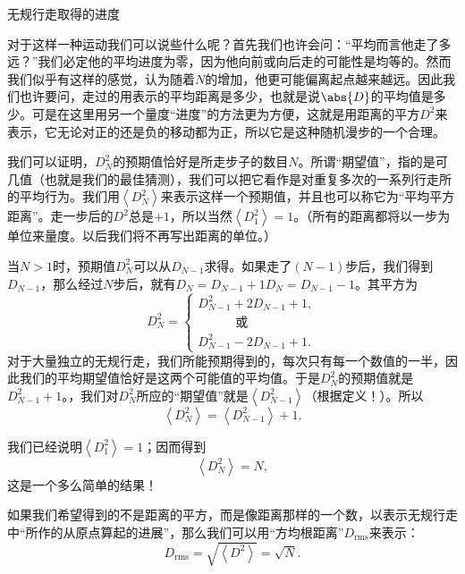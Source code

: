 \documentclass[12pt,oneside]{book}
\begin{document}
\begin{common-format}
\begin{linefig}{无规行走取得的进度}
\caption{\footnotesize 无规行走取得的进度。横座标$N$表示所走的步子总数；纵座标$D_N$表示离开起点的净距离}
\label{fig:无规行走取得的进度}
\end{linefig}

对于这样一种运动我们可以说些什么呢？首先我们也许会问：“平均而言他走了多远？”我们必定他的平均进度为零，因为他向前或向后走的可能性是均等的。然而我们似乎有这样的感觉，认为随着$N$的增加，他更可能偏离起点越来越远。因此我们也许要问，走过的用表示的平均距离是多少，也就是说$\abs{D}$的平均值是多少。可是在这里用另一个量度“进度”的方法更为方便，这就是用距离的平方$D^2$来表示，它无论对正的还是负的移动都为正，所以它是这种随机漫步的一个合理。

我们可以证明，$D_N^2$的预期值恰好是所走步子的数目$N$。所谓“期望值”，指的是可几值（也就是我们的最佳猜测），我们可以把它看作是对重复多次的一系列行走所的平均行为。我们用$\left <D_N^2 \right >$来表示这样一个预期值，并且也可以称它为“平均平方距离”。走一步后的$D^2$总是$+1$，所以当然$\left < D_1^2 \right >=1$。（所有的距离都将以一步为单位来量度。以后我们将不再写出距离的单位。）

当$N>1$时，预期值$D_N^2$可以从$D_{N-1}$求得。如果走了$(N-1)$步后，我们得到$D_{N-1}$，那么经过$N$步后，就有$D_N=D_{N-1}+1$$D_N=D_{N-1}-1$。其平方为
\begin{equation}
\label{Eq:I:6:7}
D_N^2=
\begin{cases}
D_{N-1}^2+2D_{N-1}+1,\\[2ex]
\quad\qquad\textit{或}\\[2ex]
D_{N-1}^2-2D_{N-1}+1.
\end{cases}
\end{equation}
对于大量独立的无规行走，我们所能预期得到的，每次只有每一个数值的一半，因此我们的平均期望值恰好是这两个可能值的平均值。于是$D_N^2$的预期值就是$D_{N-1}^2+1$。，我们对$D_N^2$所应的“期望值”就是$\left <D_{N-1}^2 \right >$（根据定义！）。所以
\begin{equation}
\label{Eq:I:6:8}
\left < D_N^2 \right >=\left < D_{N-1}^2 \right >+1.
\end{equation}

我们已经说明$\left < D_1^2 \right > = 1$；因而得到
\begin{equation}
\label{Eq:I:6:9}
\left < D_N^2 \right > =N,
\end{equation} 
这是一个多么简单的结果！

如果我们希望得到的不是距离的平方，而是像距离那样的一个数，以表示无规行走中“所作的从原点算起的进展”，那么我们可以用“方均根距离”$D_{\text{rms}}$来表示：
\begin{equation}
\label{Eq:I:6:10}
D_{\text{rms}}=\sqrt{\left < D^2 \right > }=\sqrt{N}.
\end{equation}


\end{common-format}
\end{document}
